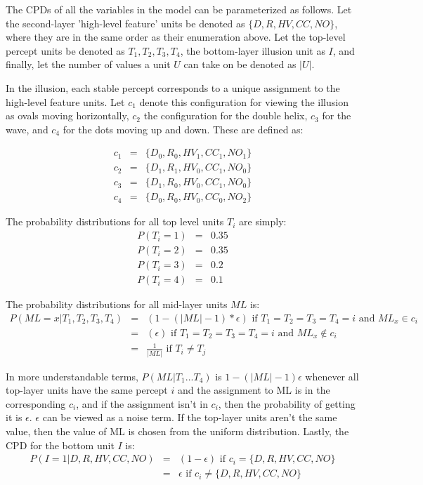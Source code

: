 \documentclass{article} %
\begin{document}
The CPDs of all the variables in the model can be parameterized as follows. Let the second-layer 'high-level feature' units be denoted as $\{D, R, HV, CC, NO\}$, where they are in the same order as their enumeration above. Let the top-level percept units be denoted as $T_1, T_2, T_3, T_4$, the bottom-layer illusion unit as $I$, and finally, let the number of values a unit $U$ can take on be denoted as $|U|$.  

In the illusion, each stable percept corresponds to a unique assignment to the high-level feature units. Let $c_1$ denote this configuration for viewing the illusion as ovals moving horizontally, $c_2$ the configuration for the double helix, $c_3$ for the wave, and $c_4$ for the dots moving up and down. These are defined as:

\begin{eqnarray*}
c_1 &=& \{D_0,R_0,HV_1,CC_1,NO_1 \} \\
c_2 &=& \{D_1,R_1,HV_0,CC_1,NO_0 \} \\
c_3 &=& \{D_1,R_0,HV_0,CC_1,NO_0 \} \\
c_4 &=& \{D_0,R_0,HV_0,CC_0,NO_2 \} 
\end{eqnarray*}

The probability distributions for all top level units $T_i$ are simply:
\begin{eqnarray*}
P(T_i = 1) &=& 0.35 \\
P(T_i = 2) &=& 0.35 \\
P(T_i = 3) &=& 0.2 \\
P(T_i = 4) &=& 0.1
\end{eqnarray*}

The probability distributions for all mid-layer units $ML$ is:
\begin{eqnarray*}
P(ML = x|T_1,T_2,T_3,T_4) &=& (1-(|ML| -1)*\epsilon) \textrm{   if } T_1=T_2=T_3=T_4=i \textrm{ and } ML_x \in c_i \\
&=& (\epsilon) \textrm{   if } T_1=T_2=T_3=T_4=i \textrm{ and } ML_x \notin c_i \\
&=& \frac{1}{|ML|} \textrm{   if } T_i \neq T_j 
\end{eqnarray*}

In more understandable terms, $P(ML|T_1...T_4)$ is $1-(|ML|-1)\epsilon$ whenever all top-layer units have the same percept $i$ and the assignment to ML is in the corresponding $c_i$, and if the assignment isn't in $c_i$, then the probability of getting it is $\epsilon$. $\epsilon$ can be viewed as a noise term. If the top-layer units aren't the same value, then the value of ML is chosen from the uniform distribution.
Lastly, the CPD for the bottom unit $I$ is:
\begin{eqnarray*}
P(I=1|D,R,HV,CC,NO) &=& (1-\epsilon) \textrm{   if } c_i = \{D,R,HV,CC,NO\} \\
&=& \epsilon \textrm{   if } c_i \neq \{D,R,HV,CC,NO\}  
\end{eqnarray*}
\end{document}
